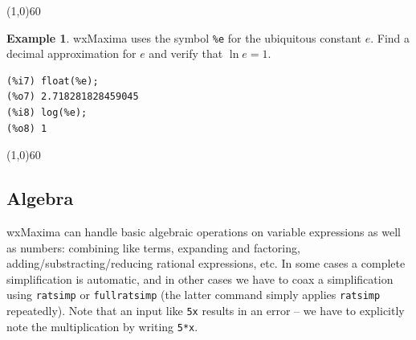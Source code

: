 \documentclass[10.5pt,twoside]{report}
\theoremstyle{definition}
\newtheorem{exmp}{Example}[section]
\begin{document}
\line(1,0){60}
\linethickness{0.5mm}




\begin{exmp}   wxMaxima uses the symbol \verb|%e| for the ubiquitous constant $e$.  Find a decimal approximation for $e$ and verify that $\ln{e}=1$.\\


\begin{verbatim}
(%i7) float(%e);
(%o7) 2.718281828459045
(%i8) log(%e);
(%o8) 1
\end{verbatim}

\end{exmp}

\line(1,0){60}
\linethickness{0.5mm}
${}$\\



\subsection{Algebra}

wxMaxima can handle basic algebraic operations on variable expressions as well as numbers:  combining like terms, expanding and factoring, adding/substracting/reducing rational expressions, etc.  In some cases a complete simplification is automatic, and in other cases we have to coax a simplification using \verb|ratsimp| or \verb|fullratsimp| (the latter command simply applies \verb|ratsimp| repeatedly).  Note that an input like \verb|5x| results in an error -- we have to explicitly note the multiplication by writing \verb|5*x|.
\end{document}
